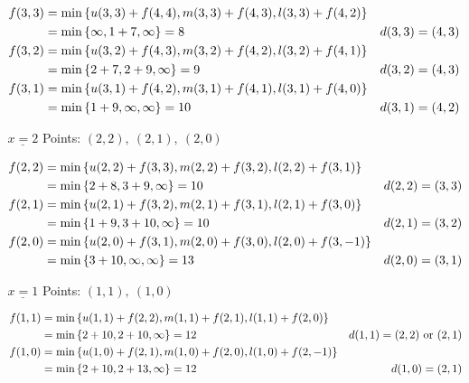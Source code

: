 \begin{prob}
\begin{enumerate}[label = {\textbf{(\greek*)}}]
\begin{sol}
\begin{itemize}
            $\begin{aligned}
            f(3,3) &= \min\left\{
            u(3,3)+f(4,4),m(3,3)+f(4,3),l(3,3)+f(4,2)\right\}\\
            &= \min\left\{\infty,1+7,\infty\right\} =8  & d(3,3)=(4,3)\\
            f(3,2) &= \min\left\{
            u(3,2)+f(4,3),m(3,2)+f(4,2),l(3,2)+f(4,1)\right\}\\
            &= \min\left\{2+7,2+9,\infty\right\} =9  & d(3,2)=(4,3)\\
            f(3,1) &= \min\left\{
            u(3,1)+f(4,2),m(3,1)+f(4,1),l(3,1)+f(4,0)\right\}\\
            &= \min\left\{1+9,\infty,\infty\right\} =10  & d(3,1)=(4,2)
            \end{aligned}$
            
            \item[$\underline{x=2}$] Points: $(2,2), \ (2,1), \ (2,0)$
            
            $\begin{aligned}
            f(2,2) &= \min\left\{
            u(2,2)+f(3,3),m(2,2)+f(3,2),l(2,2)+f(3,1)\right\}\\
            &= \min\left\{2+8,3+9,\infty\right\} =10  & d(2,2)=(3,3)\\
            f(2,1) &= \min\left\{
            u(2,1)+f(3,2),m(2,1)+f(3,1),l(2,1)+f(3,0)\right\}\\
            &= \min\left\{1+9,3+10,\infty\right\} =10  & d(2,1)=(3,2)\\
            f(2,0) &= \min\left\{
            u(2,0)+f(3,1),m(2,0)+f(3,0),l(2,0)+f(3,-1)\right\}\\
            &= \min\left\{3+10,\infty,\infty\right\} =13  & d(2,0)=(3,1)
            \end{aligned}$
            
            \item[$\underline{x=1}$] Points: $(1,1), \ (1,0)$
            
            $\begin{aligned}
            f(1,1) &= \min\left\{
            u(1,1)+f(2,2),m(1,1)+f(2,1),l(1,1)+f(2,0)\right\}\\
            &= \min\left\{2+10,2+10,\infty\right\} =12  & d(1,1)=(2,2) \text{ or } (2,1)\\
            f(1,0) &= \min\left\{
            u(1,0)+f(2,1),m(1,0)+f(2,0),l(1,0)+f(2,-1)\right\}\\
            &= \min\left\{2+10,2+13,\infty\right\} =12  & d(1,0)=(2,1)
            \end{aligned}$
            

\end{itemize}
\end{sol}
\end{enumerate}
\end{prob}
